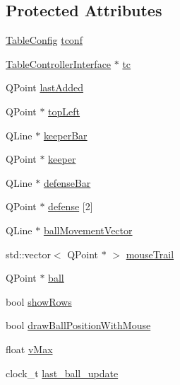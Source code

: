 \subsection*{Protected Attributes}
\begin{DoxyCompactItemize}
\item 
\hyperlink{class_table_config}{Table\+Config} \hyperlink{class_virtual_kicker_window_a2f0f4e5e72f88a140af5e5128c5fdaa5}{tconf}
\item 
\hyperlink{class_table_controller_interface}{Table\+Controller\+Interface} $\ast$ \hyperlink{class_virtual_kicker_window_ac3ec4aea0d8038f4bdd67464db20896c}{tc}
\item 
Q\+Point \hyperlink{class_virtual_kicker_window_a8fcd704eb048c7085425c490c9791eab}{last\+Added}
\item 
Q\+Point $\ast$ \hyperlink{class_virtual_kicker_window_a596d058ae2d0a344179dff44ec49607c}{top\+Left}
\item 
Q\+Line $\ast$ \hyperlink{class_virtual_kicker_window_acf98d58dc8c99023a045276be77efda7}{keeper\+Bar}
\item 
Q\+Point $\ast$ \hyperlink{class_virtual_kicker_window_af260664437593d0f4a69f996455c58d3}{keeper}
\item 
Q\+Line $\ast$ \hyperlink{class_virtual_kicker_window_a10915dc259441346e8357e9021299d09}{defense\+Bar}
\item 
Q\+Point $\ast$ \hyperlink{class_virtual_kicker_window_a288550d0c600b7091bde763b935e498f}{defense} \mbox{[}2\mbox{]}
\item 
Q\+Line $\ast$ \hyperlink{class_virtual_kicker_window_ae1f5de071cc62551a53fd6de9193803c}{ball\+Movement\+Vector}
\item 
std\+::vector$<$ Q\+Point $\ast$ $>$ \hyperlink{class_virtual_kicker_window_ab73688dd8889373a64a2076c65e7cc71}{mouse\+Trail}
\item 
Q\+Point $\ast$ \hyperlink{class_virtual_kicker_window_a136ee5843876bd2990a4023f586fde7d}{ball}
\item 
bool \hyperlink{class_virtual_kicker_window_ab8f23c4032548e57724cccc77952d981}{show\+Rows}
\item 
bool \hyperlink{class_virtual_kicker_window_a8261365dd31ecf1a929df329a6be3f82}{draw\+Ball\+Position\+With\+Mouse}
\item 
float \hyperlink{class_virtual_kicker_window_a9451df62aeb5e1219caef9b708bb647c}{v\+Max}
\item 
clock\+\_\+t \hyperlink{class_virtual_kicker_window_a091a27e61740b506b134c8dccb25955c}{last\+\_\+ball\+\_\+update}
\end{DoxyCompactItemize}


